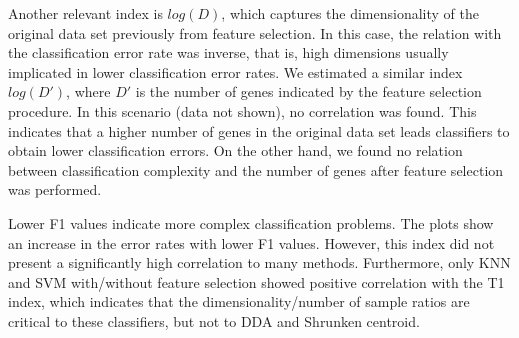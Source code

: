 \documentclass[10pt]{bmc_article}
\newenvironment{bmcformat}{\begin{raggedright}\baselineskip20pt\sloppy\setboolean{publ}{false}}{\end{raggedright}\baselineskip20pt\sloppy}
\begin{document}
\begin{bmcformat}
Another relevant index is $log(D)$, which captures the dimensionality
of the original data set previously from feature selection. In this
case, the relation with the classification error rate was inverse,
that is, high dimensions usually implicated in lower classification
error rates. We estimated a similar index $log(D')$, where $D'$ is the
number of genes indicated by the feature selection procedure. In this
scenario (data not shown), no correlation was found.  This indicates
that a higher number of genes in the original data set leads
classifiers to obtain lower classification errors. On the other hand,
we found no relation between classification complexity and the number
of genes after feature selection was performed.





Lower F1 values indicate more complex classification problems. The
plots show an increase in the error rates with lower F1
values. However, this index did not present a significantly high
correlation to many methods. Furthermore, only KNN and SVM
with/without feature selection showed positive correlation with the T1
index, which indicates that the dimensionality/number of sample ratios
are critical to these classifiers, but not to DDA and Shrunken
centroid.


\end{bmcformat}
\end{document}
